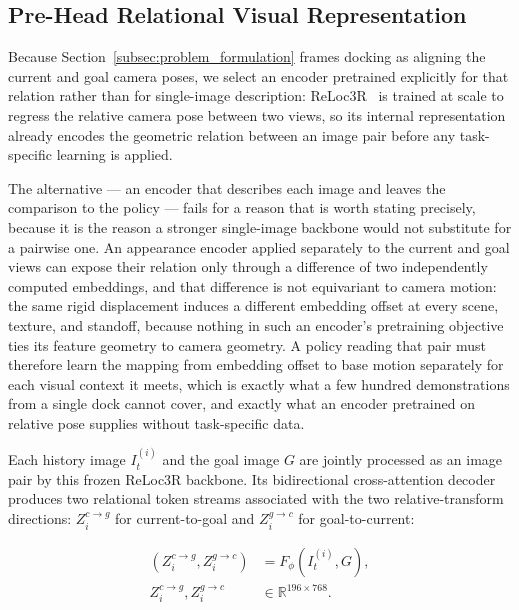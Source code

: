 \documentclass[letterpaper, 10 pt, conference]{IEEEtran}  %
\begin{document}
\subsection{Pre-Head Relational Visual Representation}
\label{subsec:relational_representation}

Because Section~\ref{subsec:problem_formulation} frames docking as aligning the current and goal camera poses, we select an encoder pretrained explicitly for that relation rather than for single-image description: ReLoc3R~\cite{c4} is trained at scale to regress the relative camera pose between two views, so its internal representation already encodes the geometric relation between an image pair before any task-specific learning is applied.

The alternative --- an encoder that describes each image and leaves the comparison to the policy --- fails for a reason that is worth stating precisely, because it is the reason a stronger single-image backbone would not substitute for a pairwise one. An appearance encoder applied separately to the current and goal views can expose their relation only through a difference of two independently computed embeddings, and that difference is not equivariant to camera motion: the same rigid displacement induces a different embedding offset at every scene, texture, and standoff, because nothing in such an encoder's pretraining objective ties its feature geometry to camera geometry. A policy reading that pair must therefore learn the mapping from embedding offset to base motion separately for each visual context it meets, which is exactly what a few hundred demonstrations from a single dock cannot cover, and exactly what an encoder pretrained on relative pose supplies without task-specific data.

Each history image $I_t^{(i)}$ and the goal image $G$ are jointly processed as an image pair by this frozen ReLoc3R backbone. Its bidirectional cross-attention decoder produces two relational token streams associated with the two relative-transform directions: $Z_i^{c\rightarrow g}$ for current-to-goal and $Z_i^{g\rightarrow c}$ for goal-to-current:

\begin{equation}
\begin{aligned}
\left(Z_i^{c\rightarrow g},Z_i^{g\rightarrow c}\right)
    &=F_\phi\!\left(I_t^{(i)},G\right),\\
Z_i^{c\rightarrow g},Z_i^{g\rightarrow c}
    &\in\mathbb{R}^{196\times768}.
\end{aligned}
\end{equation}
\end{document}
